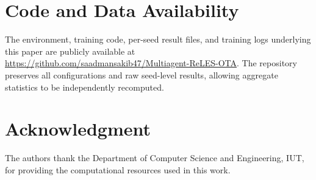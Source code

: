 \documentclass[conference]{IEEEtran}
\begin{document}
\section*{Code and Data Availability}
The environment, training code, per-seed result files, and training logs
underlying this paper are publicly available at
\url{https://github.com/saadmansakib47/Multiagent-ReLES-OTA}.
The repository preserves all configurations and raw seed-level results, allowing
aggregate statistics to be independently recomputed.

\section*{Acknowledgment}
The authors thank the Department of Computer Science and Engineering, IUT, for
providing the computational resources used in this work.
\end{document}
